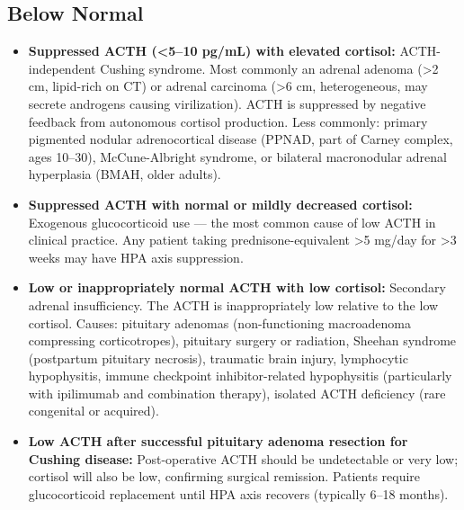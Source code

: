 \subsection*{Below Normal}
\begin{itemize}
  \item \textbf{Suppressed ACTH (<5--10 pg/mL) with elevated cortisol:} ACTH-independent Cushing syndrome. Most commonly an adrenal adenoma (>2 cm, lipid-rich on CT) or adrenal carcinoma (>6 cm, heterogeneous, may secrete androgens causing virilization). ACTH is suppressed by negative feedback from autonomous cortisol production. Less commonly: primary pigmented nodular adrenocortical disease (PPNAD, part of Carney complex, ages 10--30), McCune-Albright syndrome, or bilateral macronodular adrenal hyperplasia (BMAH, older adults).
  \item \textbf{Suppressed ACTH with normal or mildly decreased cortisol:} Exogenous glucocorticoid use --- the most common cause of low ACTH in clinical practice. Any patient taking prednisone-equivalent >5 mg/day for >3 weeks may have HPA axis suppression.
  \item \textbf{Low or inappropriately normal ACTH with low cortisol:} Secondary adrenal insufficiency. The ACTH is inappropriately low relative to the low cortisol. Causes: pituitary adenomas (non-functioning macroadenoma compressing corticotropes), pituitary surgery or radiation, Sheehan syndrome (postpartum pituitary necrosis), traumatic brain injury, lymphocytic hypophysitis, immune checkpoint inhibitor-related hypophysitis (particularly with ipilimumab and combination therapy), isolated ACTH deficiency (rare congenital or acquired).
  \item \textbf{Low ACTH after successful pituitary adenoma resection for Cushing disease:} Post-operative ACTH should be undetectable or very low; cortisol will also be low, confirming surgical remission. Patients require glucocorticoid replacement until HPA axis recovers (typically 6--18 months).
\end{itemize}

